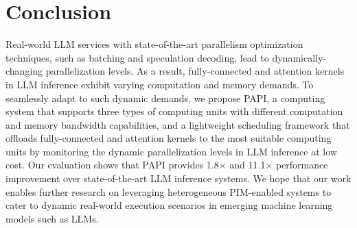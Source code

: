 \section{Conclusion}

Real-world LLM services with state-of-the-art parallelism optimization techniques, such as batching and speculation decoding, lead to dynamically-changing parallelization levels. As a result, fully-connected and attention kernels in LLM inference exhibit varying computation and memory demands. To seamlessly adapt to such dynamic demands, we propose PAPI, a computing system that supports three types of computing units with different computation and memory bandwidth capabilities, and a lightweight scheduling framework that offloads fully-connected and attention kernels to the most suitable computing units by monitoring the dynamic parallelization levels in LLM inference at low cost. 
Our evaluation shows that PAPI provides 1.8× and 11.1× performance improvement over state-of-the-art LLM inference systems.
We hope that our work enables further research on leveraging heterogeneous PIM-enabled systems to cater to dynamic real-world execution scenarios in emerging machine learning models such as LLMs.